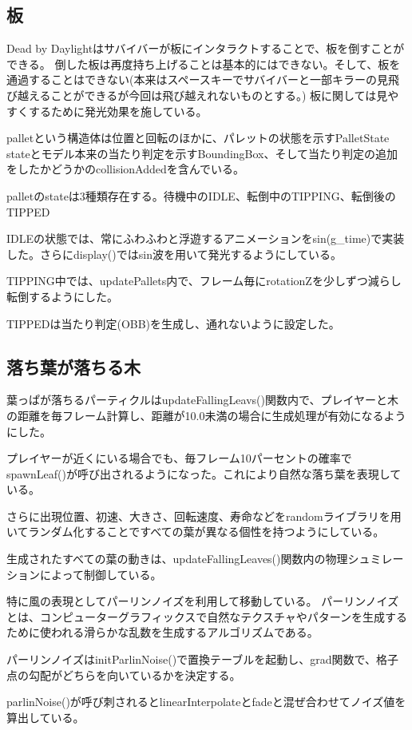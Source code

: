 \documentclass[uplatex,dvipdfmx,a4paper]{jsarticle}
\begin{document}
\subsection{板}
Dead by Daylightはサバイバーが板にインタラクトすることで、板を倒すことができる。
倒した板は再度持ち上げることは基本的にはできない。そして、板を通過することはできない(本来はスペースキーでサバイバーと一部キラーの見飛び越えることができるが今回は飛び越えれないものとする。)
板に関しては見やすくするために発光効果を施している。

palletという構造体は位置と回転のほかに、パレットの状態を示すPalletState stateとモデル本来の当たり判定を示すBoundingBox、そして当たり判定の追加をしたかどうかのcollisionAddedを含んでいる。

palletのstateは3種類存在する。待機中のIDLE、転倒中のTIPPING、転倒後のTIPPED

IDLEの状態では、常にふわふわと浮遊するアニメーションをsin(g\_time)で実装した。さらにdisplay()ではsin波を用いて発光するようにしている。

TIPPING中では、updatePallets内で、フレーム毎にrotationZを少しずつ減らし転倒するようにした。

TIPPEDは当たり判定(OBB)を生成し、通れないように設定した。

\subsection{落ち葉が落ちる木}
葉っぱが落ちるパーティクルはupdateFallingLeavs()関数内で、プレイヤーと木の距離を毎フレーム計算し、距離が10.0未満の場合に生成処理が有効になるようにした。

プレイヤーが近くにいる場合でも、毎フレーム10パーセントの確率でspawnLeaf()が呼び出されるようになった。これにより自然な落ち葉を表現している。

さらに出現位置、初速、大きさ、回転速度、寿命などをrandomライブラリを用いてランダム化することですべての葉が異なる個性を持つようにしている。

生成されたすべての葉の動きは、updateFallingLeaves()関数内の物理シュミレーションによって制御している。

特に風の表現としてパーリンノイズを利用して移動している。
パーリンノイズとは、コンピューターグラフィックスで自然なテクスチャやパターンを生成するために使われる滑らかな乱数を生成するアルゴリズムである。

パーリンノイズはinitParlinNoise()で置換テーブルを起動し、grad関数で、格子点の勾配がどちらを向いているかを決定する。

parlinNoise()が呼び刺されるとlinearInterpolateとfadeと混ぜ合わせてノイズ値を算出している。
\end{document}
